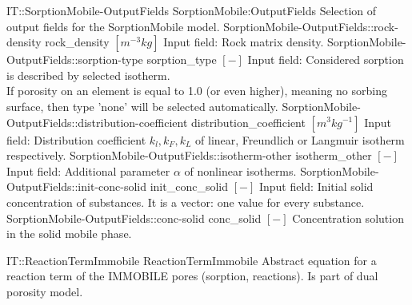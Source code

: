 \begin{SelectionType}
	{IT::SorptionMobile-OutputFields}
	{SorptionMobile:OutputFields}
	{{{Selection of output fields for the SorptionMobile model.}%
}}
		\SelectionItem
			{SorptionMobile-OutputFields::rock-density}
			{rock{\_}density}
			{{{}{$[m^{-3}kg]$}{ Input field: Rock matrix density.}%
}}
		\SelectionItem
			{SorptionMobile-OutputFields::sorption-type}
			{sorption{\_}type}
			{{{}{$[-]$}{ Input field: Considered sorption is described by selected isotherm.}\\{
If porosity on an element is equal to 1.0 (or even higher), meaning no sorbing surface, then type 'none' will be selected automatically.}%
}}
		\SelectionItem
			{SorptionMobile-OutputFields::distribution-coefficient}
			{distribution{\_}coefficient}
			{{{}{$[m^{3}kg^{-1}]$}{ Input field: Distribution coefficient }{ $k_l, k_F, k_L $}{ of linear, Freundlich or Langmuir isotherm respectively.}%
}}
		\SelectionItem
			{SorptionMobile-OutputFields::isotherm-other}
			{isotherm{\_}other}
			{{{}{$[-]$}{ Input field: Additional parameter }{$ \alpha $}{ of nonlinear isotherms.}%
}}
		\SelectionItem
			{SorptionMobile-OutputFields::init-conc-solid}
			{init{\_}conc{\_}solid}
			{{{}{$[-]$}{ Input field: Initial solid concentration of substances.
It is a vector: one value for every substance.}%
}}
		\SelectionItem
			{SorptionMobile-OutputFields::conc-solid}
			{conc{\_}solid}
			{{{}{$[-]$}{ Concentration solution in the solid mobile phase.}%
}}
\end{SelectionType}
\begin{AbstractType}
	{IT::ReactionTermImmobile}
	{ReactionTermImmobile}
	{}
	{{{Abstract equation for a reaction term of the IMMOBILE pores (sorption, reactions). Is part of dual porosity model.}%
}}
\end{AbstractType}
